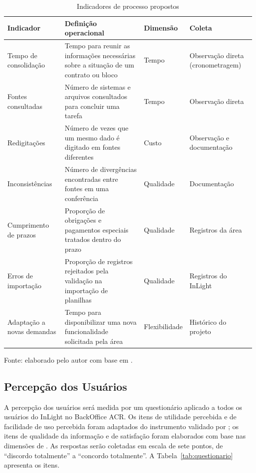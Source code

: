 \begin{table}[H]
\centering
\caption{Indicadores de processo propostos}
\label{tab:indicadores}
\footnotesize
\begin{tabularx}{\textwidth}{P{3.4cm}XP{1.9cm}P{2.6cm}}
\toprule
\textbf{Indicador} & \textbf{Definição operacional} & \textbf{Dimensão} & \textbf{Coleta} \\ \midrule
Tempo de consolidação & Tempo para reunir as informações necessárias sobre a situação de um contrato ou bloco & Tempo & Observação direta (cronometragem) \\ \midrule
Fontes consultadas & Número de sistemas e arquivos consultados para concluir uma tarefa & Tempo & Observação direta \\ \midrule
Redigitações & Número de vezes que um mesmo dado é digitado em fontes diferentes & Custo & Observação e documentação \\ \midrule
Inconsistências & Número de divergências encontradas entre fontes em uma conferência & Qualidade & Documentação \\ \midrule
Cumprimento de prazos & Proporção de obrigações e pagamentos especiais tratados dentro do prazo & Qualidade & Registros da área \\ \midrule
Erros de importação & Proporção de registros rejeitados pela validação na importação de planilhas & Qualidade & Registros do InLight \\ \midrule
Adaptação a novas demandas & Tempo para disponibilizar uma nova funcionalidade solicitada pela área & Flexibilidade & Histórico do projeto \\ \bottomrule
\end{tabularx}

\vspace{0.2cm}
{\footnotesize Fonte: elaborado pelo autor com base em \citet{dumas2018}.}
\end{table}

\subsection{Percepção dos Usuários}

A percepção dos usuários será medida por um questionário aplicado a todos os usuários do InLight no BackOffice ACR. Os itens de utilidade percebida e de facilidade de uso percebida foram adaptados do instrumento validado por \citet{davis1989}; os itens de qualidade da informação e de satisfação foram elaborados com base nas dimensões de \citet{delone2003}. As respostas serão coletadas em escala de sete pontos, de ``discordo totalmente'' a ``concordo totalmente''. A Tabela~\ref{tab:questionario} apresenta os itens.

